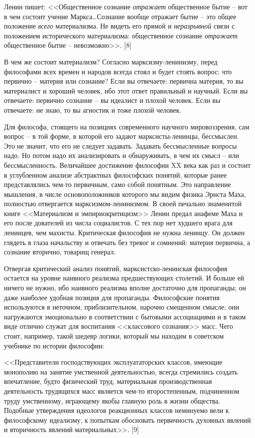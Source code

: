 \documentclass{book}
\begin{document}
Ленин пишет: <<Общественное сознание \textit{отражает}  общест­венное бытие -- вот в чем состоит учение Маркса\ldots Сознание 
вообще отражает бытие -- это общее положение \textit{всего}  матери­ализма. Не видеть его прямой и \textit{неразрывной}  связи с 
положе­нием исторического материализма: общественное сознание \textit{отражает}  общественное бытие -- невозможно>>. [8]

В чем же состоит материализм? Согласно марксизму-лени­низму, перед философами всех времен и народов всегда стоял и будет стоять 
вопрос: что первично -- материя или сознание? Если вы отвечаете: первична материя, то вы материалист и хороший человек, ибо этот 
ответ правильный и научный. Если вы отвечаете: первично сознание -- вы идеалист и плохой чело­век. Если вы отвечаете: не знаю, то 
вы агностик и тоже плохой человек.


Для философа, стоящего на позициях современного науч­ного мировоззрения, сам вопрос -- в той форме, в которой его задают 
марксисты-ленинцы, бессмыслен. Это не значит, что его не следует задавать. Задавать бессмысленные вопросы надо. Но потом надо их 
анализировать и обнаруживать, в чем их смысл -- или бессмысленность. Величайшее достижение фило­софии XX века как раз и состоит в 
углубленном анализе абст­рактных философских понятий, которые ранее представлялись чем-то первичным, само собой понятным. Это 
направление мышления, в числе основоположников которого мы видим физика Эрнста Маха, полностью отвергается 
марксизмом-ленинизмом. В своей печально знаменитой книге <<Материализм и эмпириокритицизм>> Ленин предал анафеме Маха и его после­
дователей из числа социалистов. С тех пор нет худшего врага для ленинцев, чем махисты. Критическая философия не нужна ленинцу. 
Он должен глядеть в глаза начальству и отвечать без тревог и сомнений: материя первична, а сознание вторично, товарищ генерал.

Отвергая критический анализ понятий, марксистско-ленинская философия остается на уровне наивного реализма пред­шествующих 
столетий. И больше ей ничего не нужно, ибо наив­ного реализма вполне достаточно для пропаганды; он даже наиболее удобная позиция 
для пропаганды. Философские поня­тия используются в неточном, приблизительном, нарочно сме­щенном смысле; они нагружаются 
эмоционально в соответст­вии с бытовыми ассоциациями и в таком виде отлично служат для воспитания <<классового сознания>> масс. 
Чего стоит, напри­мер, такой шедевр логики, который мы находим в советском учебнике по истории философии:

<<Представители господствующих эксплуататорских классов, имеющие монополию на занятие умственной деятельностью, всегда стремились 
создать впечатление, будто физический труд, материальная производственная деятельность трудящихся масс является чем-то 
второстепенным, подчиненном труду умствен­ному, играющему якобы главную роль в жизни общества. Подобные утверждения идеологов 
реакционных классов неми­нуемо вели к философскому идеализму, к попыткам обосно­вать первичность духовных явлений и вторичность 
явлений ма­териальных>>. [9]
\end{document}
